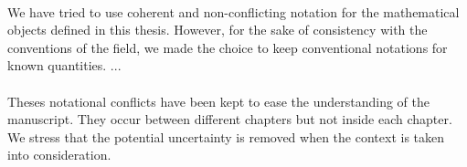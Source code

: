 \\
We have tried to use coherent and non-conflicting notation for the mathematical objects defined in this thesis. However, for the sake of consistency with the conventions of the field, we made the choice to keep conventional notations for known quantities. ...\\
\\
Theses notational conflicts have been kept to ease the understanding of the manuscript. They occur between different chapters but not inside each chapter. We stress that the potential uncertainty is removed when the context is taken into consideration.









